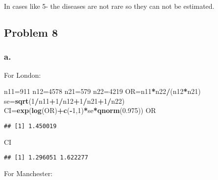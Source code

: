 \documentclass[]{article}
\newenvironment{Shaded}{\begin{snugshade}}{\end{snugshade}}
\newcommand{\KeywordTok}[1]{\textcolor[rgb]{0.13,0.29,0.53}{\textbf{#1}}}
\newcommand{\DecValTok}[1]{\textcolor[rgb]{0.00,0.00,0.81}{#1}}
\newcommand{\FloatTok}[1]{\textcolor[rgb]{0.00,0.00,0.81}{#1}}
\newcommand{\OperatorTok}[1]{\textcolor[rgb]{0.81,0.36,0.00}{\textbf{#1}}}
\newcommand{\NormalTok}[1]{#1}
\begin{document}
In cases like 5- the diseases are not rare so they can not be estimated.

\subsection{Problem 8}\label{problem-8}

\subsubsection{a.}\label{a.-3}

For London:

\begin{Shaded}
\begin{Highlighting}[]
\NormalTok{n11=}\DecValTok{911}
\NormalTok{n12=}\DecValTok{4578}
\NormalTok{n21=}\DecValTok{579}
\NormalTok{n22=}\DecValTok{4219}
\NormalTok{OR=n11}\OperatorTok{*}\NormalTok{n22}\OperatorTok{/}\NormalTok{(n12}\OperatorTok{*}\NormalTok{n21)}
\NormalTok{se=}\KeywordTok{sqrt}\NormalTok{(}\DecValTok{1}\OperatorTok{/}\NormalTok{n11}\OperatorTok{+}\DecValTok{1}\OperatorTok{/}\NormalTok{n12}\OperatorTok{+}\DecValTok{1}\OperatorTok{/}\NormalTok{n21}\OperatorTok{+}\DecValTok{1}\OperatorTok{/}\NormalTok{n22)}
\NormalTok{CI=}\KeywordTok{exp}\NormalTok{(}\KeywordTok{log}\NormalTok{(OR)}\OperatorTok{+}\KeywordTok{c}\NormalTok{(}\OperatorTok{-}\DecValTok{1}\NormalTok{,}\DecValTok{1}\NormalTok{)}\OperatorTok{*}\NormalTok{se}\OperatorTok{*}\KeywordTok{qnorm}\NormalTok{(}\FloatTok{0.975}\NormalTok{))}
\NormalTok{OR}
\end{Highlighting}
\end{Shaded}

\begin{verbatim}
## [1] 1.450019
\end{verbatim}

\begin{Shaded}
\begin{Highlighting}[]
\NormalTok{CI}
\end{Highlighting}
\end{Shaded}

\begin{verbatim}
## [1] 1.296051 1.622277
\end{verbatim}

For Manchester:
\end{document}
